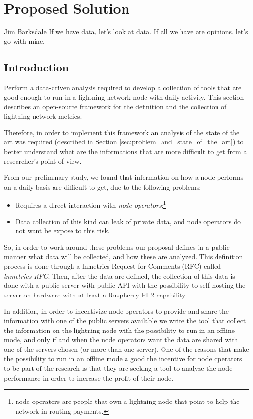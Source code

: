 \chapter{Proposed Solution}

\begin{chapquote}{Jim Barksdale}
If we have data, let’s look at data. If all we have are opinions, let’s go with mine.
\end{chapquote}

\section{Introduction}

Perform a data-driven analysis required to develop a collection of tools
that are good enough to run in a lightning network node with daily activity. 
This section describes an open-source framework for the definition and 
the collection of lightning network metrics.

Therefore, in order to implement this framework an analysis of the state 
of the art was required (described in Section \ref{sec:problem_and_state_of_the_art})
to better understand what are the informations that are more difficult 
to get from a researcher's point of view.

From our preliminary study, we found that information on how a node performs 
on a daily basis are difficult to get, due to the following problems:
\begin{itemize}
    \item Requires a direct interaction with \emph{node operators};\footnote{node operators are people that own a 
        lightning node that point to help the network in routing payments.}
    \item Data collection of this kind can leak of private data, and node operators
        do not want be expose to this risk.
\end{itemize}

So, in order to work around these problems our proposal defines in a 
public manner what data will be collected, and how these are analyzed. This 
definition process is done through a lnmetrics Request for Comments (RFC) 
called \emph{lnmetrics RFC}. Then, after the data are defined, the collection 
of this data is done with a public server with public API with the possibility 
to self-hosting the server on hardware with at least a Raspberry PI 2 capability.

In addition, in order to incentivize node operators to provide and share the 
information with one of the public servers available we write the tool that 
collect the information on the lightning node with the possibility to run 
in an offline mode, and only if and when the node operators want the data 
are shared with one of the servers chosen (or more than one server).
One of the reasons that make the possibility to run in an offline mode a good
the incentive for node operators to be part of the research is that they 
are seeking a tool to analyze the node performance in order to increase the profit of
their node.


